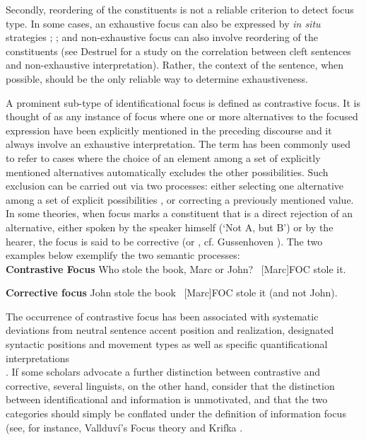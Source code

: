 \documentclass[12pt]{report}
\begin{document}
Secondly, reordering of the constituents is not a reliable criterion to detect focus type. In some cases, an exhaustive focus can also be expressed by \textit{in situ} strategies \cite{gabriel2010focus}; \cite{fery2001focus}; \cite{uth2014spanish} and non-exhaustive focus can also involve reordering of the constituents (see Destruel \cite{destruel2012french} for a study on the correlation between cleft sentences and non-exhaustive interpretation). Rather, the context of the sentence, when possible, should be the only reliable way to determine exhaustiveness.


A prominent sub-type of identificational focus is defined as contrastive focus. It is thought of as any instance of focus where one or more alternatives to the focused expression have been explicitly mentioned in the preceding discourse \cite{chafe1976givenness} and it always involve an exhaustive interpretation. The term has been commonly used to refer to cases where the choice of an element among a set of explicitly mentioned alternatives automatically excludes the other possibilities. Such exclusion can be carried out via two processes: either selecting one alternative among a set of explicit possibilities \cite{dik1981typology}, or correcting a previously mentioned value. 
In some theories, when focus marks a constituent that is a direct rejection of an alternative, either spoken by the speaker himself (‘Not A, but B’) or by the hearer, the focus is said to be corrective (or , cf. Gussenhoven \cite{gussenhoven2008types}). The two examples below exemplify the two semantic processes:\\



\noindent
\textbf{Contrastive Focus}
\pex \label{EX11}
\a Who stole the book, Marc or John?
\vspace{-0.3cm}
\a \ [Marc]\tiny{FOC} \normalsize stole it.
\xe 

\noindent
\textbf{Corrective focus}
\pex \label{EX12}
\a John stole the book
\vspace{-0,3cm}
\a  \ [Marc]\tiny FOC \normalsize{stole it (and not John)}.
\xe
\vspace{-0.3cm}

\noindent
The occurrence of contrastive focus has been associated with systematic deviations from neutral sentence accent position and realization, designated syntactic positions and movement types as well as specific quantificational interpretations \\
\noindent
\cite{dufter2009focus}. If some scholars advocate a further distinction between contrastive and corrective, several linguists, on the other hand, consider that the distinction between identificational and information is unmotivated, and that the two categories should simply  be conflated under the definition of information focus (see, for instance, Vallduví's Focus theory \cite{vallduvi1992informational} and  Krifka \cite{krifka2008basic}.
\end{document}
